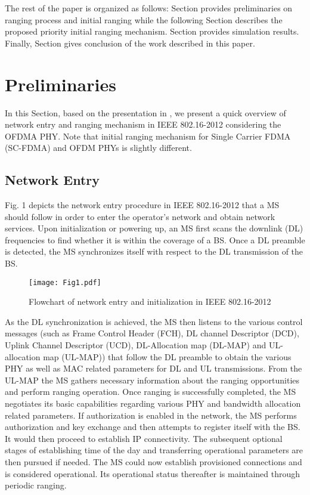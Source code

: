 \documentclass[preprint,12pt]{elsarticle}
\begin{document}
The rest of the paper is organized as follows: Section  provides preliminaries on ranging process and initial ranging while the following Section  describes the proposed priority initial ranging mechanism. Section  provides simulation results. Finally, Section  gives conclusion of the work described in this paper.

\section{Preliminaries}
In this Section, based on the presentation in \cite{Ahmadi}\cite{Taha}, we present a quick overview of network entry and ranging mechanism in IEEE 802.16-2012 considering the OFDMA PHY. Note that initial ranging mechanism for Single Carrier FDMA (SC-FDMA) and OFDM PHYs is slightly different.

\subsection{Network Entry}
Fig. 1 depicts the network entry procedure in IEEE 802.16-2012 that a MS should follow in order to enter the operator's network and obtain network services. Upon initialization or powering up, an MS first scans the downlink (DL) frequencies to find whether it is within the coverage of a BS. Once a DL preamble is detected, the MS synchronizes itself with respect to the DL transmission of the BS.

\begin{figure}[h]
\centering
\texttt{[image: Fig1.pdf]}
\centering
\caption{Flowchart of network entry and initialization in IEEE 802.16-2012 \cite{standard}}
\end{figure}

\noindent As the DL synchronization is achieved, the MS then listens to the various control messages (such as Frame Control Header (FCH), DL channel Descriptor (DCD), Uplink Channel Descriptor (UCD), DL-Allocation map (DL-MAP) and UL-allocation map (UL-MAP))  that follow the DL preamble to obtain the various PHY as well as MAC related  parameters for DL and UL transmissions. From the UL-MAP the MS gathers necessary information about the ranging opportunities and perform ranging operation. Once ranging is successfully completed, the MS negotiates its basic capabilities regarding various PHY and bandwidth allocation related parameters. If authorization is enabled in the network, the MS performs authorization and key exchange and then attempts to register itself with the BS. It would then proceed to establish IP connectivity. The subsequent optional stages of establishing time of the day and transferring operational parameters are then pursued if needed. The MS could now establish provisioned connections and is considered operational. Its operational status thereafter is maintained through periodic ranging.
\end{document}
